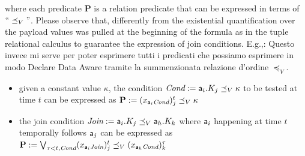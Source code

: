 %
where each predicate $\mathbf{P}$ is a relation predicate that can be expressed in terms of $\mathtt{``}\preceq_V\mathtt{"}$. Please observe that, differently from \cite{DBLP:conf/bpm/MaggiDGM13} the existential quantification over the payload values was pulled at the beginning of the formula as in the tuple relational calculus \cite{10.1145/362384.362685}  to guarantee the expression of join conditions. E.g.,:
{\color{blue} Questo invece mi serve per poter esprimere tutti i predicati che possiamo esprimere in modo Declare Data Aware tramite la summenzionata relazione d'ordine $\preceq_V$.}
\begin{itemize}
	\item given a constant value $\kappa$, the condition $\textit{Cond}:=\mathsf{a}_i.K_j\preceq_V \kappa$ to be tested at time $t$ can be expressed as $\mathbf{P}:=(x_{\mathsf{a}_i\textit{Cond}})_j^t\preceq_V\kappa$
	\item the join condition $\textit{Join}:=\mathsf{a}_i.K_j\preceq_V \mathsf{a}_h.K_k$ where $\mathsf{a}_i$ happening at time $t$ {\color{blue}temporally} follows $\mathsf{a}_j$  can be expressed as $\mathbf{P}:=\bigvee_{\tau<t,\textit{Cond}}(x_{\mathsf{a}_i\textit{Join}})_j^t\preceq_V (x_{\mathsf{a}_h\textit{Cond}})_k^\tau$
\end{itemize} 


